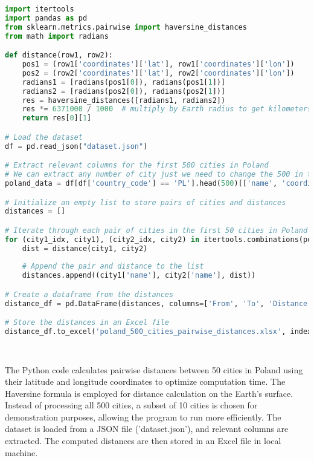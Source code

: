 \begin{center}
    \begin{lstlisting}[language=Python, caption=Loading the Dataset]
    import itertools
import pandas as pd
from sklearn.metrics.pairwise import haversine_distances
from math import radians

def distance(row1, row2):
    pos1 = (row1['coordinates']['lat'], row1['coordinates']['lon'])
    pos2 = (row2['coordinates']['lat'], row2['coordinates']['lon'])
    radians1 = [radians(pos1[0]), radians(pos1[1])]
    radians2 = [radians(pos2[0]), radians(pos2[1])]
    res = haversine_distances([radians1, radians2])
    res *= 6371000 / 1000  # multiply by Earth radius to get kilometers
    return res[0][1]

# Load the dataset
df = pd.read_json("dataset.json")

# Extract relevant columns for the first 500 cities in Poland
# We can extract any number of city just we need to change the 500 in this with any number i want.
poland_data = df[df['country_code'] == 'PL'].head(500)[['name', 'coordinates']]

# Initialize an empty list to store pairs of cities and distances
distances = []

# Iterate through each pair of cities in the first 50 cities in Poland
for (city1_idx, city1), (city2_idx, city2) in itertools.combinations(poland_data.iterrows(), 2):
    dist = distance(city1, city2)
    
    # Append the pair and distance to the list
    distances.append((city1['name'], city2['name'], dist))

# Create a dataframe from the distances
distance_df = pd.DataFrame(distances, columns=['From', 'To', 'Distance'])

# Store the distances in an Excel file
distance_df.to_excel('poland_500_cities_pairwise_distances.xlsx', index=False)

        
    \end{lstlisting}
\end{center}
The Python code calculates pairwise distances between 50 cities in Poland using their latitude and longitude coordinates to optimize computation time. The Haversine formula is employed for distance calculation on the Earth's surface. Instead of processing all 500 cities, a subset of 10 cities is chosen for demonstration purposes, allowing the program to run more efficiently. The dataset is loaded from a JSON file ('dataset.json'), and relevant columns are extracted. The computed distances are then stored in an Excel file in local machine.
\newpage
